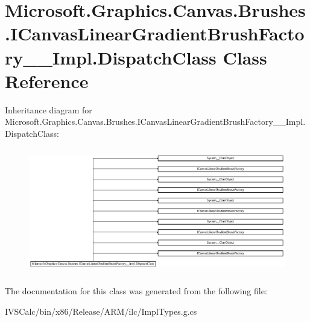 \hypertarget{class_microsoft_1_1_graphics_1_1_canvas_1_1_brushes_1_1_i_canvas_linear_gradient_brush_factory_____impl_1_1_dispatch_class}{}\section{Microsoft.\+Graphics.\+Canvas.\+Brushes.\+I\+Canvas\+Linear\+Gradient\+Brush\+Factory\+\_\+\+\_\+\+Impl.\+Dispatch\+Class Class Reference}
\label{class_microsoft_1_1_graphics_1_1_canvas_1_1_brushes_1_1_i_canvas_linear_gradient_brush_factory_____impl_1_1_dispatch_class}
Inheritance diagram for Microsoft.\+Graphics.\+Canvas.\+Brushes.\+I\+Canvas\+Linear\+Gradient\+Brush\+Factory\+\_\+\+\_\+\+Impl.\+Dispatch\+Class\+:\begin{figure}[H]
\begin{center}
\leavevmode
\includegraphics[height=5.539568cm]{class_microsoft_1_1_graphics_1_1_canvas_1_1_brushes_1_1_i_canvas_linear_gradient_brush_factory_____impl_1_1_dispatch_class}
\end{center}
\end{figure}


The documentation for this class was generated from the following file\+:\begin{DoxyCompactItemize}
\item 
I\+V\+S\+Calc/bin/x86/\+Release/\+A\+R\+M/ilc/Impl\+Types.\+g.\+cs\end{DoxyCompactItemize}
